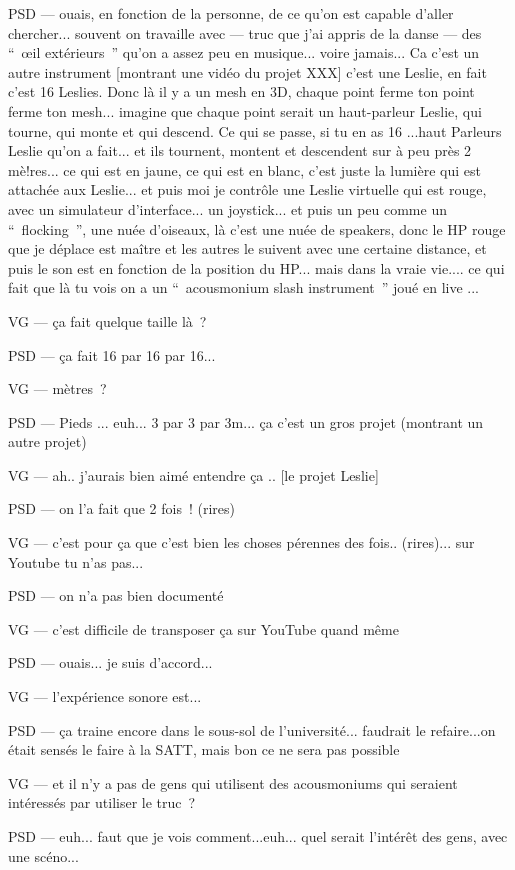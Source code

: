 PSD — ouais, en fonction de la personne, de ce qu'on est capable d'aller chercher... souvent on travaille avec — truc que j'ai appris de la danse — des “ œil extérieurs ” qu'on a assez peu en musique... voire jamais... Ca c'est un autre instrument [montrant une vidéo du projet XXX] c'est une Leslie, en fait c'est 16 Leslies. Donc là il y a un mesh en 3D, chaque point ferme ton point ferme ton mesh... imagine que chaque point serait un haut-parleur Leslie, qui tourne, qui monte et qui descend. Ce qui se passe, si tu en as 16 ...haut Parleurs Leslie qu'on a fait... et ils tournent, montent et descendent sur à peu près 2 mè!res... ce qui est en jaune, ce qui est en blanc, c'est juste la lumière qui est attachée aux Leslie... et puis moi je contrôle une Leslie virtuelle qui est rouge, avec un simulateur d'interface... un joystick... et puis un peu comme un “ flocking ”, une nuée d'oiseaux, là c'est une nuée de speakers, donc le HP rouge que je déplace est maître et les autres le suivent avec une certaine distance, et puis le son est en fonction de la position du HP... mais dans la vraie vie.... ce qui fait que là tu vois on a un “ acousmonium slash instrument ” joué en live ...  

VG — ça fait quelque taille là ? 

PSD — ça fait 16 par 16 par 16...  

VG — mètres ? 

PSD — Pieds ... euh... 3 par 3 par 3m... ça c'est un gros projet (montrant un autre projet) 

VG — ah.. j'aurais bien aimé entendre ça .. [le projet Leslie] 

PSD — on l'a fait que 2 fois ! (rires) 

VG — c'est pour ça que c'est bien les choses pérennes des fois.. (rires)... sur Youtube tu n'as pas... 

PSD — on n'a pas bien documenté 

VG — c'est difficile de transposer ça sur YouTube quand même 

PSD — ouais... je suis d'accord... 

VG — l'expérience sonore est... 

PSD — ça traine encore dans le sous-sol de l'université... faudrait le refaire...on était sensés le faire à la SATT, mais bon ce ne sera pas possible 

VG — et il n'y a pas de gens qui utilisent des acousmoniums qui seraient intéressés par utiliser le truc ? 

PSD — euh... faut que je vois comment...euh... quel serait l'intérêt des gens, avec une scéno... 

